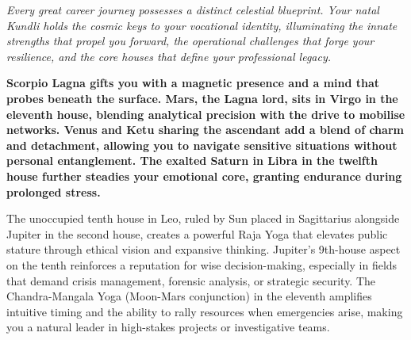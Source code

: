 


{\fontsize{9.5}{14}\selectfont\color{DeepSlate}\itshape Every great career journey possesses a distinct celestial blueprint. Your natal Kundli holds the cosmic keys to your vocational identity, illuminating the innate strengths that propel you forward, the operational challenges that forge your resilience, and the core houses that define your professional legacy.}\par\vspace{3.5mm}

\label{topic7}

{\fontsize{9.5}{13.8}\selectfont\bfseries\color{DeepSlate} Scorpio Lagna gifts you with a magnetic presence and a mind that probes beneath the surface. Mars, the Lagna lord, sits in Virgo in the eleventh house, blending analytical precision with the drive to mobilise networks. Venus and Ketu sharing the ascendant add a blend of charm and detachment, allowing you to navigate sensitive situations without personal entanglement. The exalted Saturn in Libra in the twelfth house further steadies your emotional core, granting endurance during prolonged stress.}\par\vspace{2mm}

{\fontsize{9}{13}\selectfont The unoccupied tenth house in Leo, ruled by Sun placed in Sagittarius alongside Jupiter in the second house, creates a powerful Raja Yoga that elevates public stature through ethical vision and expansive thinking. Jupiter's 9th-house aspect on the tenth reinforces a reputation for wise decision-making, especially in fields that demand crisis management, forensic analysis, or strategic security. The Chandra-Mangala Yoga (Moon-Mars conjunction) in the eleventh amplifies intuitive timing and the ability to rally resources when emergencies arise, making you a natural leader in high-stakes projects or investigative teams.}\par\vspace{1.8mm}

